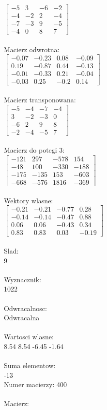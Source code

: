 \documentclass[a4paper,12pt]{article}
\begin{document}
$\begin{bmatrix} -5&3&-6&-2\\-4&-2&2&-4\\-7&-3&9&-5\\-4&0&8&7 \end{bmatrix}$
\\
\\
Macierz odwrotna:\\

$\begin{bmatrix} -0.07&-0.23&0.08&-0.09\\0.19&-0.87&0.44&-0.13\\-0.01&-0.33&0.21&-0.04\\-0.03&0.25&-0.2&0.14 \end{bmatrix}$
\\
\\
Macierz transponowana:\\

$\begin{bmatrix} -5&-4&-7&-4\\3&-2&-3&0\\-6&2&9&8\\-2&-4&-5&7 \end{bmatrix}$
\\
\\
Macierz do potegi 3:\\

$\begin{bmatrix} -121&297&-578&154\\-48&100&-330&-188\\-175&-135&153&-603\\-668&-576&1816&-369 \end{bmatrix}$
\\
\\
Wektory wlasne:\\

$\begin{bmatrix} -0.21&-0.21&-0.77&0.28\\-0.14&-0.14&-0.47&0.88\\0.06&0.06&-0.43&0.34\\0.83&0.83&0.03&-0.19 \end{bmatrix}$
\\
\\
Slad:\\
9
\\
\\
Wyznacznik:\\
1022
\\
\\
Odwracalnosc:\\
Odwracalna
\\
\\
Wartosci wlasne:\\
8.54 8.54 -6.45 -1.64
\\
\\
Suma elementow:\\
-13
\\
\newpage
Numer macierzy:
400
\\
\\
Macierz:\\
\end{document}
